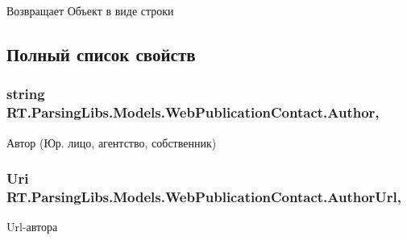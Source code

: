 \begin{DoxyReturn}{Возвращает}
Объект в виде строки
\end{DoxyReturn}


\subsection{Полный список свойств}
\hypertarget{class_r_t_1_1_parsing_libs_1_1_models_1_1_web_publication_contact_acc84023c3534ee76f037ce31f8b1de07}{
\subsubsection[{Author}]{\setlength{\rightskip}{0pt plus 5cm}string R\+T.\+Parsing\+Libs.\+Models.\+Web\+Publication\+Contact.\+Author\hspace{0.3cm}{\ttfamily [get]}, {\ttfamily [set]}}}\label{class_r_t_1_1_parsing_libs_1_1_models_1_1_web_publication_contact_acc84023c3534ee76f037ce31f8b1de07}


Автор (Юр. лицо, агентство, собственник) 

\hypertarget{class_r_t_1_1_parsing_libs_1_1_models_1_1_web_publication_contact_a74f50fc2119d21f385cf0be3ffba017a}{
\subsubsection[{Author\+Url}]{\setlength{\rightskip}{0pt plus 5cm}Uri R\+T.\+Parsing\+Libs.\+Models.\+Web\+Publication\+Contact.\+Author\+Url\hspace{0.3cm}{\ttfamily [get]}, {\ttfamily [set]}}}\label{class_r_t_1_1_parsing_libs_1_1_models_1_1_web_publication_contact_a74f50fc2119d21f385cf0be3ffba017a}


Url-\/автора 

